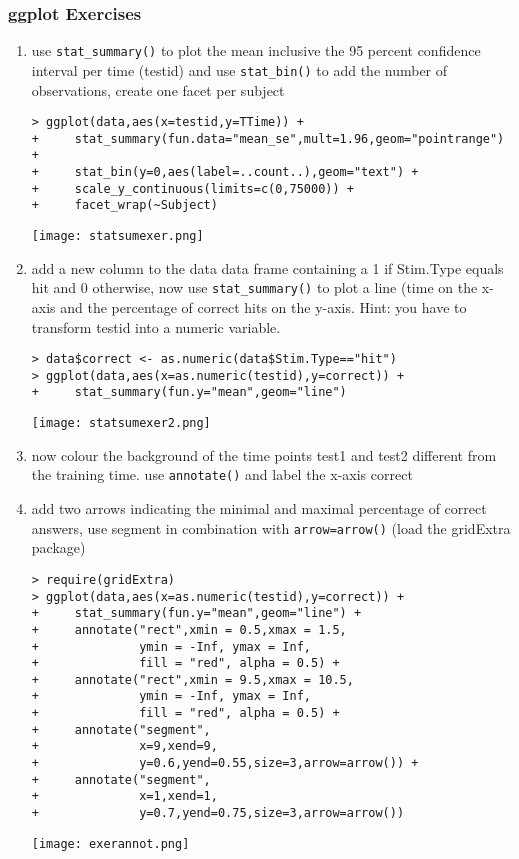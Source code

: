 \begin{frame}\frametitle{ggplot Exercises}
  \begin{enumerate}
  \item use \texttt{stat\_summary()} to plot the mean inclusive the 95 percent confidence interval per time (testid) and use \texttt{stat\_bin()} to add the number of observations, create one facet per subject
\begin{verbatim}
> ggplot(data,aes(x=testid,y=TTime)) +
+     stat_summary(fun.data="mean_se",mult=1.96,geom="pointrange") +
+     stat_bin(y=0,aes(label=..count..),geom="text") +
+     scale_y_continuous(limits=c(0,75000)) +
+     facet_wrap(~Subject)
\end{verbatim}
\begin{center}
  \texttt{[image: statsumexer.png]}
\end{center}
  \item add a new column to the data data frame containing a 1 if Stim.Type equals hit and 0 otherwise, now use \texttt{stat\_summary()} to plot a line (time on the x-axis and the percentage of correct hits on the y-axis. Hint: you have to transform testid into a numeric variable.
\begin{verbatim}
> data$correct <- as.numeric(data$Stim.Type=="hit")
> ggplot(data,aes(x=as.numeric(testid),y=correct)) +
+     stat_summary(fun.y="mean",geom="line")
\end{verbatim}
\begin{center}
  \texttt{[image: statsumexer2.png]}
\end{center}
  \item now colour the background of the time points test1 and test2 different from the training time. use \texttt{annotate()} and label the x-axis correct
  \item add two arrows indicating the minimal and maximal percentage of correct answers, use segment in combination with \texttt{arrow=arrow()} (load the gridExtra package)
\begin{verbatim}
> require(gridExtra)
> ggplot(data,aes(x=as.numeric(testid),y=correct)) +
+     stat_summary(fun.y="mean",geom="line") +
+     annotate("rect",xmin = 0.5,xmax = 1.5,
+              ymin = -Inf, ymax = Inf,
+              fill = "red", alpha = 0.5) +
+     annotate("rect",xmin = 9.5,xmax = 10.5,
+              ymin = -Inf, ymax = Inf,
+              fill = "red", alpha = 0.5) +
+     annotate("segment",
+              x=9,xend=9,
+              y=0.6,yend=0.55,size=3,arrow=arrow()) +
+     annotate("segment",
+              x=1,xend=1,
+              y=0.7,yend=0.75,size=3,arrow=arrow())
\end{verbatim}
\begin{center}
  \texttt{[image: exerannot.png]}
\end{center}
  \end{enumerate}
\end{frame}
